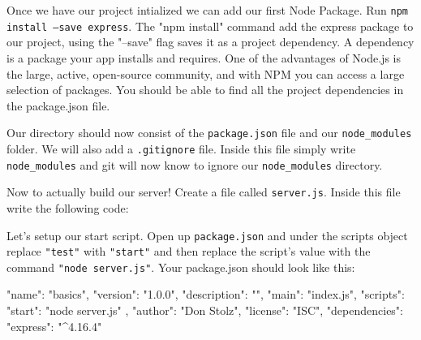 \documentclass{42-en}
\begin{document}
	Once we have our project intialized we can add our first Node Package. Run \texttt{npm install --save express}. The "npm install" command add the express package to our project, using the "--save" flag saves it as a project dependency. A dependency is a package your app installs and requires. One of the advantages of Node.js is the large, active, open-source community, and with NPM you can access a large selection of packages. You should be able to find all the project dependencies in the package.json file.
	
	Our directory should now consist of the \texttt{package.json} file and our \texttt{node\_modules} folder. We will also add a \texttt{.gitignore} file. Inside this file simply write \texttt{node\_modules} and git will now know to ignore our \texttt{node\_modules} directory.
	
	Now to actually build our server! Create a file called \texttt{server.js}. Inside this file write the following code:
	


\newpage
	Let's setup our start script. Open up \texttt{package.json} and under the scripts object replace \texttt{"test"} with \texttt{"start"} and then replace the script's value with the command \texttt{"node server.js"}. Your package.json should look like this:

\begin{42jscode}
{
    "name": "basics",
    "version": "1.0.0",
    "description": "",
    "main": "index.js",
    "scripts": {
        "start": "node server.js"
    },
    "author": "Don Stolz",
    "license": "ISC",
    "dependencies": {
        "express": "^4.16.4"
    }
}
\end{42jscode}
\end{document}
